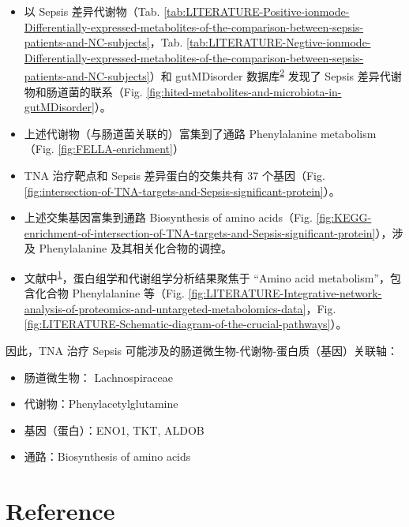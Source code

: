 \documentclass[
]{article}
\providecommand{\tightlist}{%
  \setlength{\itemsep}{0pt}\setlength{\parskip}{0pt}}
\begin{document}
\begin{itemize}
\tightlist
\item
  以 Sepsis 差异代谢物（Tab. \ref{tab:LITERATURE-Positive-ionmode-Differentially-expressed-metabolites-of-the-comparison-between-sepsis-patients-and-NC-subjects}，Tab. \ref{tab:LITERATURE-Negtive-ionmode-Differentially-expressed-metabolites-of-the-comparison-between-sepsis-patients-and-NC-subjects}）和 gutMDisorder 数据库\textsuperscript{\protect\hyperlink{ref-GutmdisorderACheng2019}{2}} 发现了 Sepsis 差异代谢物和肠道菌的联系（Fig. \ref{fig:hited-metabolites-and-microbiota-in-gutMDisorder}）。
\item
  上述代谢物（与肠道菌关联的）富集到了通路 Phenylalanine metabolism（Fig. \ref{fig:FELLA-enrichment}）
\item
  TNA 治疗靶点和 Sepsis 差异蛋白的交集共有 37 个基因（Fig. \ref{fig:intersection-of-TNA-targets-and-Sepsis-significant-protein}）。
\item
  上述交集基因富集到通路 Biosynthesis of amino acids（Fig. \ref{fig:KEGG-enrichment-of-intersection-of-TNA-targets-and-Sepsis-significant-protein}），涉及 Phenylalanine 及其相关化合物的调控。
\item
  文献中\textsuperscript{\protect\hyperlink{ref-IntegrativeAnaChen2022}{1}}，蛋白组学和代谢组学分析结果聚焦于 ``Amino acid metabolism''，包含化合物 Phenylalanine 等（Fig. \ref{fig:LITERATURE-Integrative-network-analysis-of-proteomics-and-untargeted-metabolomics-data}，Fig. \ref{fig:LITERATURE-Schematic-diagram-of-the-crucial-pathways}）。
\end{itemize}

因此，TNA 治疗 Sepsis 可能涉及的肠道微生物-代谢物-蛋白质（基因）关联轴：

\begin{itemize}
\tightlist
\item
  肠道微生物： Lachnospiraceae
\item
  代谢物：Phenylacetylglutamine
\item
  基因（蛋白）：ENO1, TKT, ALDOB
\item
  通路：Biosynthesis of amino acids
\end{itemize}

\hypertarget{bibliography}{%
\section*{Reference}\label{bibliography}}
\end{document}

